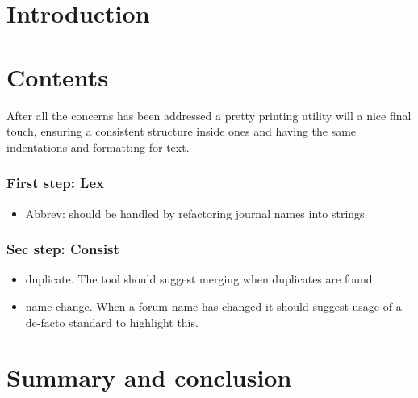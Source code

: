 \section{Introduction}

\section{Contents}

After all the concerns has been addressed a pretty printing utility
will a nice final touch, ensuring a consistent structure inside ones
 and having the same indentations and formatting for text.

\subsubsection{First step: Lex}
\begin{itemize}
\item Abbrev: should be handled by refactoring journal names into
  strings.
\end{itemize}

\subsubsection{Sec step: Consist}
\begin{itemize}
\item duplicate.  The tool should suggest merging when duplicates are
  found.
\item name change. When a forum name has changed it should suggest
  usage of a de-facto standard to highlight this.
\end{itemize}

\section{Summary and conclusion}
